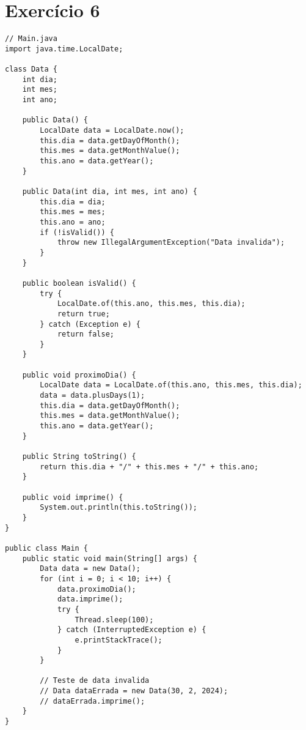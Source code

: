 \documentclass[12pt,a4paper,brazil]{article}
\begin{document}
\section*{Exercício 6}
\begin{lstlisting}
// Main.java
import java.time.LocalDate;

class Data {
    int dia;
    int mes;
    int ano;

    public Data() {
        LocalDate data = LocalDate.now();
        this.dia = data.getDayOfMonth();
        this.mes = data.getMonthValue();
        this.ano = data.getYear();
    }

    public Data(int dia, int mes, int ano) {
        this.dia = dia;
        this.mes = mes;
        this.ano = ano;
        if (!isValid()) {
            throw new IllegalArgumentException("Data invalida");
        }
    }

    public boolean isValid() {
        try {
            LocalDate.of(this.ano, this.mes, this.dia);
            return true;
        } catch (Exception e) {
            return false;
        }
    }

    public void proximoDia() {
        LocalDate data = LocalDate.of(this.ano, this.mes, this.dia);
        data = data.plusDays(1);
        this.dia = data.getDayOfMonth();
        this.mes = data.getMonthValue();
        this.ano = data.getYear();
    }

    public String toString() {
        return this.dia + "/" + this.mes + "/" + this.ano;
    }

    public void imprime() {
        System.out.println(this.toString());
    }
}

public class Main {
    public static void main(String[] args) {
        Data data = new Data();
        for (int i = 0; i < 10; i++) {
            data.proximoDia();
            data.imprime();
            try {
                Thread.sleep(100);
            } catch (InterruptedException e) {
                e.printStackTrace();
            }
        }

        // Teste de data invalida
        // Data dataErrada = new Data(30, 2, 2024);
        // dataErrada.imprime();
    }
}
\end{lstlisting}
\end{document}
